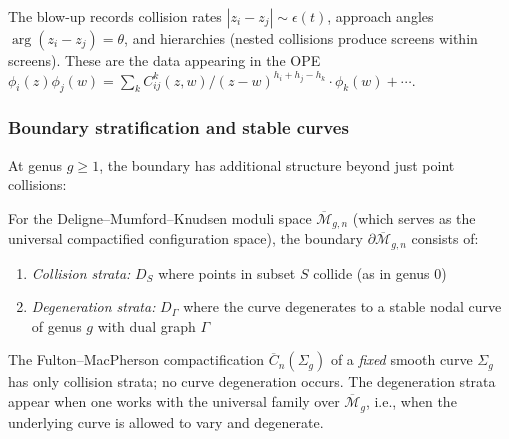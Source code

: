 \begin{remark}\label{rem:recording-collisions}
The blow-up records collision rates $|z_i - z_j| \sim \epsilon(t)$, approach angles $\arg(z_i - z_j) = \theta$, and hierarchies (nested collisions produce screens within screens).  These are the data appearing in the OPE $\phi_i(z)\phi_j(w) = \sum_k C_{ij}^k(z,w)/(z-w)^{h_i+h_j-h_k} \cdot \phi_k(w) + \cdots$.
\end{remark}

\subsubsection{Boundary stratification and stable curves}

At genus $g \geq 1$, the boundary has additional structure beyond just point collisions:

\begin{theorem}\label{thm:boundary-higher-genus}
For the Deligne--Mumford--Knudsen moduli space $\overline{\mathcal{M}}_{g,n}$ (which serves as the universal compactified configuration space), the boundary $\partial\overline{\mathcal{M}}_{g,n}$ consists of:

\begin{enumerate}
\item \emph{Collision strata:} $D_S$ where points in subset $S$ collide (as in genus 0)
\item \emph{Degeneration strata:} $D_{\Gamma}$ where the curve degenerates to a stable nodal curve of genus $g$ with dual graph $\Gamma$
\end{enumerate}

The Fulton--MacPherson compactification $\overline{C}_n(\Sigma_g)$ of a \emph{fixed} smooth curve $\Sigma_g$ has only collision strata; no curve degeneration occurs. The degeneration strata appear when one works with the universal family over $\overline{\mathcal{M}}_g$, i.e., when the underlying curve is allowed to vary and degenerate.
\end{theorem}

